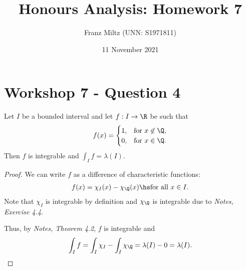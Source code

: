 \documentclass{article}
\begin{document}
\title{Honours Analysis: Homework 7}
\author{Franz Miltz (UNN: S1971811)}
\date{11 November 2021}
\maketitle

\section*{Workshop 7 - Question 4}

\begin{claim*}
   Let $I$ be a bounded interval and let $f:I\to\R$ be such that 
   \begin{align*}
      f(x) = \begin{cases}
         1, &\text{for }x\not\in\Q,\\
         0, &\text{for }x\in\Q.
      \end{cases}
   \end{align*}
   Then $f$ is integrable and $\int_I f = \lambda(I)$.
\end{claim*}
\begin{proof}
   We can write $f$ as a difference of characteristic functions:
   \begin{align*}
      f(x) = \chi_I(x) - \chi_\Q(x)\hs\text{for all }x\in I.
   \end{align*}
   Note that $\chi_I$ is integrable by definition and $\chi_\Q$ is integrable due to
   \emph{Notes, Exercise 4.4}. 
   
   Thus, by \emph{Notes, Theorem 4.2}, $f$ is integrable and 
   \begin{align*}
      \int_I f = \int_I \chi_I - \int_I \chi_\Q = \lambda(I)-0 = \lambda(I).
   \end{align*}
\end{proof}
\end{document}
